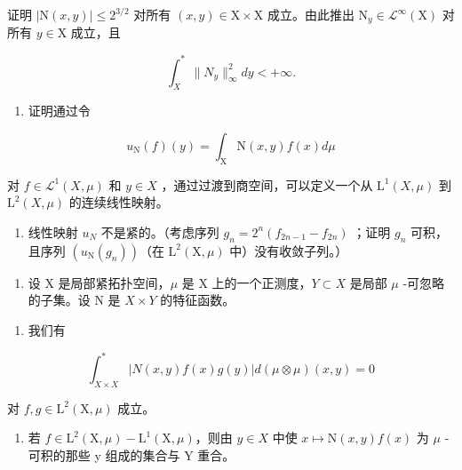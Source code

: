 证明 \(|\mathrm{N}(x,y)| \leqslant 2^{3/2}\) 对所有 \((x,y) \in \mathrm{X} \times \mathrm{X}\) 成立。由此推出 \(\mathrm{N}_y \in \mathcal{L}^\infty(\mathrm{X})\) 对所有 \(y \in \mathrm{X}\) 成立，且

\[
\int_ {X} ^ {*} \| N _ {y} \| _ {\infty} ^ {2} d y <   + \infty .
\]

\begin{enumerate}
\def\labelenumi{\alph{enumi})}
\setcounter{enumi}{2}
\tightlist
\item
  证明通过令
\end{enumerate}

\[
u _ {\mathrm{N}} (f) (y) = \int_ {\mathrm{X}} \mathrm{N} (x, y) f (x) d \mu
\]

对 \(f \in \mathcal{L}^{1}(X, \mu)\) 和 \(y \in X\) ，通过过渡到商空间，可以定义一个从 \(\mathrm{L}^{1}(X, \mu)\) 到 \(\mathrm{L}^{2}(X, \mu)\) 的连续线性映射。

\begin{enumerate}
\def\labelenumi{\alph{enumi})}
\setcounter{enumi}{3}
\tightlist
\item
  线性映射 \(u_{N}\) 不是紧的。（考虑序列 \(g_{n}=2^{n}(f_{2n-1}-f_{2n})\) ；证明 \(g_{n}\) 可积，且序列 \((u_{\mathrm{N}}(g_{n}))\)（在 \(\mathrm{L}^{2}(\mathrm{X},\mu)\) 中）没有收敛子列。）
\end{enumerate}

\begin{enumerate}
\def\labelenumi{\arabic{enumi})}
\setcounter{enumi}{2}
\tightlist
\item
  设 X 是局部紧拓扑空间，\(\mu\) 是 X 上的一个正测度，\(Y \subset X\) 是局部 \(\mu\) -可忽略的子集。设 N 是 \(X \times Y\) 的特征函数。
\end{enumerate}

\begin{enumerate}
\def\labelenumi{\alph{enumi})}
\tightlist
\item
  我们有
\end{enumerate}

\[
\int_ {X \times X} ^ {*} | N (x, y) f (x) g (y) | d (\mu \otimes \mu) (x, y) = 0
\]

对 \(f, g \in \mathrm{L}^2(\mathrm{X}, \mu)\) 成立。

\begin{enumerate}
\def\labelenumi{\alph{enumi})}
\setcounter{enumi}{1}
\tightlist
\item
  若 \(f \in \mathrm{L}^{2}(\mathrm{X}, \mu) - \mathrm{L}^{1}(\mathrm{X}, \mu)\)，则由 \(y \in X\) 中使 \(x \mapsto \mathrm{N}(x, y)f(x)\) 为 \(\mu\) -可积的那些 y 组成的集合与 Y 重合。
\end{enumerate}

